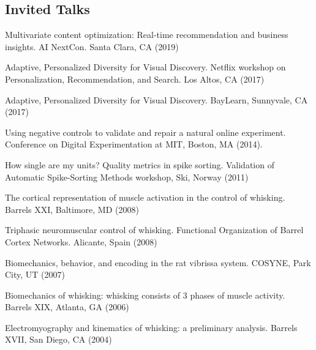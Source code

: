 \documentclass[line,11pt]{res}
\begin{document}
\begin{resume}
\section{Invited Talks}
\vspace{0.1in}

Multivariate content optimization: Real-time recommendation and business insights. AI NextCon. Santa Clara, CA (2019)

Adaptive, Personalized Diversity for Visual Discovery. Netflix workshop on Personalization, Recommendation, and Search. Los Altos, CA (2017)

Adaptive, Personalized Diversity for Visual Discovery. BayLearn, Sunnyvale, CA (2017)

Using negative controls to validate and repair a natural online experiment.  Conference on Digital Experimentation at MIT, Boston, MA (2014).

How single are my units? Quality metrics in spike sorting. Validation of Automatic Spike-Sorting Methods workshop, Ski, Norway (2011)

The cortical representation of muscle activation in the control of whisking. Barrels XXI, Baltimore, MD (2008)

Triphasic neuromuscular control of whisking. Functional Organization of Barrel Cortex Networks. Alicante, Spain (2008)

Biomechanics, behavior, and encoding in the rat vibrissa system. COSYNE, Park City, UT (2007)

Biomechanics of whisking: whisking consists of 3 phases of muscle activity. Barrels XIX, Atlanta, GA (2006)

Electromyography and kinematics of whisking: a preliminary analysis. Barrels XVII, San Diego, CA (2004)

\end{resume}
\end{document}
